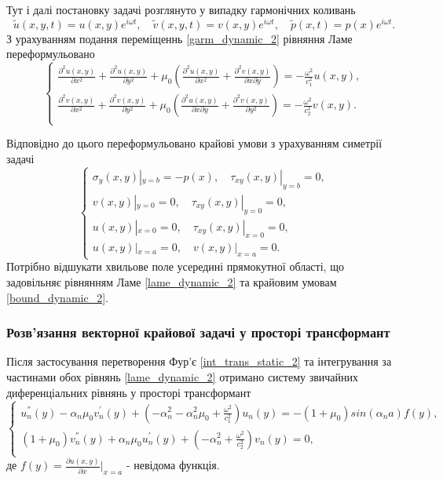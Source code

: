 Тут і далі постановку задачі розглянуто у випадку гармонічних коливань
\begin{equation}\label{garm_dynamic_2}
    \widetilde{u}(x,y,t) = u(x,y) e^{i \omega t}, \quad  \widetilde{v}(x,y,t) = v(x,y) e^{i \omega t}, \quad  \widetilde{p}(x,t) = p(x) e^{i \omega t}.
\end{equation}
З урахуванням подання переміщеннь \eqref{garm_dynamic_2} рівняння Ламе переформульовано
\begin{equation}\label{lame_dynamic_2}
    \begin{cases}
        \frac{\partial^2 u(x,y)}{\partial x^2} + \frac{\partial^2 u(x,y)}{\partial y^2} + \mu_0 (\frac{\partial^2 u(x,y)}{\partial x^2} + \frac{\partial^2 v(x,y)}{\partial x\partial y}) = -\frac{\omega^2}{c_1^2}  u(x,y), \\
        \frac{\partial^2 v(x,y)}{\partial x^2} + \frac{\partial^2 v(x,y)}{\partial y^2} + \mu_0 (\frac{\partial^2 u(x,y)}{\partial x \partial y} + \frac{\partial^2 v(x,y)}{\partial y^2}) = -\frac{\omega^2}{c_2^2} v(x,y). \\
    \end{cases}
\end{equation}

Відповідно до цього переформульовано крайові умови з урахуванням симетрії задачі
\begin{equation}\label{bound_dynamic_2}
    \begin{cases}
        \sigma_y(x, y) |_{y=b} = -p(x), \quad  \tau_{xy}(x,y) |_{y=b} =0, \\
        v(x,y) |_{y=0} = 0, \quad \tau_{xy}(x,y) |_{y=0} = 0, \\
        u(x,y) |_{x=0} = 0, \quad \tau_{xy}(x,y) |_{x=0} = 0, \\
        u(x,y) |_{x=a} = 0, \quad v(x,y) |_{x=a} = 0.
    \end{cases}
\end{equation}
Потрібно відшукати хвильове поле усередині прямокутної області, що задовільняє рівнянням Ламе \eqref{lame_dynamic_2} та крайовим умовам \eqref{bound_dynamic_2}.

\subsubsection{Розв'язання векторної крайової задачі у просторі трансформант}
Після застосування перетворення Фур'є \eqref{int_trans_static_2} та інтегрування за частинами обох рівнянь \eqref{lame_dynamic_2} отримано систему звичайних диференціальних рівнянь у просторі трансформант
\begin{equation}\label{transf_dynamic_2}
    \begin{cases}
        u_n^{''}(y) - \alpha_n \mu_0 v_n^{'}(y) + (-\alpha_n^2 -\alpha_n^2 \mu_0 + \frac{\omega^2}{c_1^2}) u_n(y) = -(1 + \mu_0)sin(\alpha_n a) f(y), \\
        (1 + \mu_0) v_n^{''}(y) + \alpha_n \mu_0 u_n^{'}(y) + (- \alpha_n^2 + \frac{\omega^2}{c_2^2}) v_n(y) = 0,\\
    \end{cases}
\end{equation}
де $f(y) = \frac{\partial u(x,y)}{\partial x}|_{x=a}$ - невідома функція.

